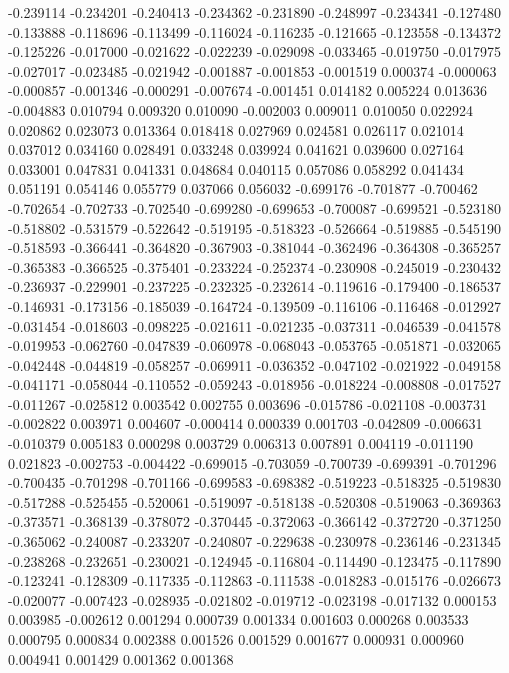 -0.239114
-0.234201
-0.240413
-0.234362
-0.231890
-0.248997
-0.234341
-0.127480
-0.133888
-0.118696
-0.113499
-0.116024
-0.116235
-0.121665
-0.123558
-0.134372
-0.125226
-0.017000
-0.021622
-0.022239
-0.029098
-0.033465
-0.019750
-0.017975
-0.027017
-0.023485
-0.021942
-0.001887
-0.001853
-0.001519
0.000374
-0.000063
-0.000857
-0.001346
-0.000291
-0.007674
-0.001451
0.014182
0.005224
0.013636
-0.004883
0.010794
0.009320
0.010090
-0.002003
0.009011
0.010050
0.022924
0.020862
0.023073
0.013364
0.018418
0.027969
0.024581
0.026117
0.021014
0.037012
0.034160
0.028491
0.033248
0.039924
0.041621
0.039600
0.027164
0.033001
0.047831
0.041331
0.048684
0.040115
0.057086
0.058292
0.041434
0.051191
0.054146
0.055779
0.037066
0.056032
-0.699176
-0.701877
-0.700462
-0.702654
-0.702733
-0.702540
-0.699280
-0.699653
-0.700087
-0.699521
-0.523180
-0.518802
-0.531579
-0.522642
-0.519195
-0.518323
-0.526664
-0.519885
-0.545190
-0.518593
-0.366441
-0.364820
-0.367903
-0.381044
-0.362496
-0.364308
-0.365257
-0.365383
-0.366525
-0.375401
-0.233224
-0.252374
-0.230908
-0.245019
-0.230432
-0.236937
-0.229901
-0.237225
-0.232325
-0.232614
-0.119616
-0.179400
-0.186537
-0.146931
-0.173156
-0.185039
-0.164724
-0.139509
-0.116106
-0.116468
-0.012927
-0.031454
-0.018603
-0.098225
-0.021611
-0.021235
-0.037311
-0.046539
-0.041578
-0.019953
-0.062760
-0.047839
-0.060978
-0.068043
-0.053765
-0.051871
-0.032065
-0.042448
-0.044819
-0.058257
-0.069911
-0.036352
-0.047102
-0.021922
-0.049158
-0.041171
-0.058044
-0.110552
-0.059243
-0.018956
-0.018224
-0.008808
-0.017527
-0.011267
-0.025812
0.003542
0.002755
0.003696
-0.015786
-0.021108
-0.003731
-0.002822
0.003971
0.004607
-0.000414
0.000339
0.001703
-0.042809
-0.006631
-0.010379
0.005183
0.000298
0.003729
0.006313
0.007891
0.004119
-0.011190
0.021823
-0.002753
-0.004422
-0.699015
-0.703059
-0.700739
-0.699391
-0.701296
-0.700435
-0.701298
-0.701166
-0.699583
-0.698382
-0.519223
-0.518325
-0.519830
-0.517288
-0.525455
-0.520061
-0.519097
-0.518138
-0.520308
-0.519063
-0.369363
-0.373571
-0.368139
-0.378072
-0.370445
-0.372063
-0.366142
-0.372720
-0.371250
-0.365062
-0.240087
-0.233207
-0.240807
-0.229638
-0.230978
-0.236146
-0.231345
-0.238268
-0.232651
-0.230021
-0.124945
-0.116804
-0.114490
-0.123475
-0.117890
-0.123241
-0.128309
-0.117335
-0.112863
-0.111538
-0.018283
-0.015176
-0.026673
-0.020077
-0.007423
-0.028935
-0.021802
-0.019712
-0.023198
-0.017132
0.000153
0.003985
-0.002612
0.001294
0.000739
0.001334
0.001603
0.000268
0.003533
0.000795
0.000834
0.002388
0.001526
0.001529
0.001677
0.000931
0.000960
0.004941
0.001429
0.001362
0.001368
